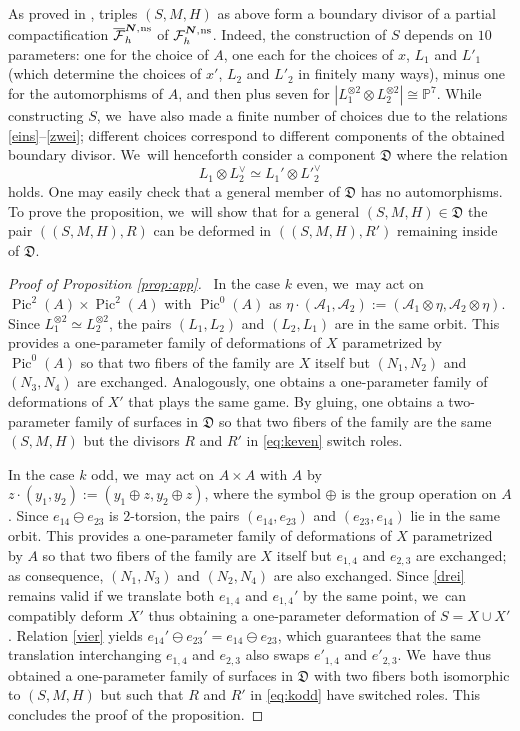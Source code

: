 \documentclass[JEP,XML,SOM,Unicode,NoEqCountersInSection,published]{cedram}
\newcommand{\ns}{{\mkern1mu\mathrm{ns}}}
\newcommand{\bN}{\boldsymbol{N}}
\theoremstyle{plain}
\theoremstyle{definition}
\DeclareMathOperator{\Pic}{Pic}
\newcommand\PP{{\mathbb P}}
\newcommand\A{{\mathcal A}}
\newcommand\F{{\mathcal F}}
\begin{document}
As proved in \cite[Cor.\,5.9 \& Prop.\,5.4]{KLV1},
triples $(S,M,H)$ as above form a boundary divisor of a partial compactification $\overline{\F}_h^{\bN,\ns}$ of $\F_h^{\bN,\ns}$. Indeed, the construction of $S$
depends on $10$ parameters: one for the choice of $A$, one each for the choices of $x$, $L_1$ and $L'_1$ (which determine the choices of $x'$, $L_2$ and $L'_2$ in finitely many ways), minus one for the automorphisms of $A$, and then plus seven for $|L_1^{\otimes2}\otimes L_2^{\otimes 2}| \cong \PP^7$. While constructing $S$, we~have also made a finite number of choices due to the relations \eqref{eins}--\eqref{zwei}; different choices correspond to different components of the obtained boundary divisor. We~will henceforth consider a component $\mathfrak D$ where the relation
\begin{equation}\label{vier}
L_1\otimes L_2^\vee\simeq L_1'\otimes {L'}_2^\vee
\end{equation}
holds. One may easily check that a general member of $\mathfrak D$ has no automorphisms. To prove the proposition, we~will show that for a general $(S,M,H) \in \mathfrak D$ the pair $((S,M,H),R)$ can be deformed in $((S,M,H),R')$ remaining inside of $\mathfrak D$.

\begin{proof}[Proof of Proposition \ref{prop:app}]\
In the case $k$ even, we~may act on $\Pic^2(A)\times \Pic^2(A)$ with $\Pic^0(A)$ as $\eta\cdot (\A_1,\A_2):=(\A_1\otimes \eta, \A_2\otimes \eta)$. Since $L_1^{\otimes 2}\simeq L_2^{\otimes 2}$, the pairs $(L_1,L_2)$ and $(L_2,L_1)$ are in the same orbit. This provides a one-parameter family of deformations of $X$ parametrized by $\Pic^0(A)$ so that two fibers of the family are $X$ itself but $(N_1,N_2)$ and $(N_3,N_4)$ are exchanged. Analogously, one obtains a one-parameter family of deformations of $X'$ that plays the same game. By gluing, one obtains a two-parameter family of surfaces in $\mathfrak D$ so that two fibers of the family are the same $(S,M,H)$ but the divisors $R$ and $R'$ in \eqref{eq:keven} switch roles.

In the case $k$ odd, we~may act on $A\times A$ with $A$ by $z\cdot (y_1,y_2):=(y_1\oplus z,y_2\oplus z)$, where the symbol $\oplus$ is the group operation on $A$. Since $e_{14}\ominus e_{23}$ is $2$-torsion, the pairs $(e_{14}, e_{23})$ and $(e_{23},e_{14})$ lie in the same orbit. This provides a one-parameter family of deformations of $X$ parametrized by $A$ so that two fibers of the family are $X$ itself but $e_{1,4}$ and $e_{2,3}$ are exchanged; as consequence, $(N_1,N_3)$ and $(N_2,N_4)$ are also exchanged. Since \eqref{drei} remains valid if we translate both $e_{1,4}$ and $e_{1,4}'$ by the same point, we~can compatibly deform $X'$ thus obtaining a one-parameter deformation of $S=X\cup X'$. Relation \eqref{vier} yields $e_{14}'\ominus e_{23}'=e_{14}\ominus e_{23}$, which guarantees that the same translation interchanging $e_{1,4}$ and $e_{2,3}$ also swaps $e'_{1,4}$ and $e'_{2,3}$. We~have thus obtained a one-parameter family of surfaces in $\mathfrak D$ with two fibers both isomorphic to $(S,M,H)$ but such that $R$ and $R'$ in \eqref{eq:kodd} have switched roles. This concludes the proof of the proposition.
\end{proof}

\backmatter


\end{document}
